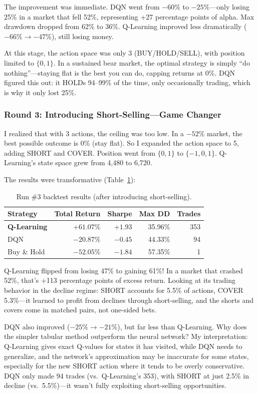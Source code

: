 \documentclass[11pt,a4paper]{article}
\begin{document}
The improvement was immediate. DQN went from $-60\%$ to $-25\%$---only losing 25\% in a market that fell 52\%, representing +27 percentage points of alpha. Max drawdown dropped from 62\% to 36\%. Q-Learning improved less dramatically ($-66\% \to -47\%$), still losing money.

At this stage, the action space was only 3 (BUY/HOLD/SELL), with position limited to $\{0, 1\}$. In a sustained bear market, the optimal strategy is simply ``do nothing''---staying flat is the best you can do, capping returns at 0\%. DQN figured this out: it HOLDs 94--99\% of the time, only occasionally trading, which is why it only lost 25\%.

\subsubsection{Round 3: Introducing Short-Selling---Game Changer}

I realized that with 3 actions, the ceiling was too low. In a $-52\%$ market, the best possible outcome is 0\% (stay flat). So I expanded the action space to 5, adding SHORT and COVER. Position went from $\{0,1\}$ to $\{-1,0,1\}$. Q-Learning's state space grew from 4,480 to 6,720.

The results were transformative (Table~\ref{tab:run3}):

\begin{table}[H]
\centering
\caption{Run \#3 backtest results (after introducing short-selling).}
\label{tab:run3}
\begin{tabular}{lrrrr}
\toprule
Strategy & Total Return & Sharpe & Max DD & Trades \\
\midrule
\textbf{Q-Learning} & $\mathbf{+61.07\%}$ & $\mathbf{+1.93}$ & 35.96\% & 353 \\
DQN        & $-20.87\%$ & $-0.45$ & 44.33\% & 94 \\
Buy \& Hold & $-52.05\%$ & $-1.84$ & 57.35\% & 1 \\
\bottomrule
\end{tabular}
\end{table}

Q-Learning flipped from losing 47\% to gaining 61\%! In a market that crashed 52\%, that's +113 percentage points of excess return. Looking at its trading behavior in the decline regime: SHORT accounts for 5.5\% of actions, COVER 5.3\%---it learned to profit from declines through short-selling, and the shorts and covers come in matched pairs, not one-sided bets.

DQN also improved ($-25\% \to -21\%$), but far less than Q-Learning. Why does the simpler tabular method outperform the neural network? My interpretation: Q-Learning gives exact Q-values for states it has visited, while DQN needs to generalize, and the network's approximation may be inaccurate for some states, especially for the new SHORT action where it tends to be overly conservative. DQN only made 94 trades (vs.\ Q-Learning's 353), with SHORT at just 2.5\% in decline (vs.\ 5.5\%)---it wasn't fully exploiting short-selling opportunities.
\end{document}
